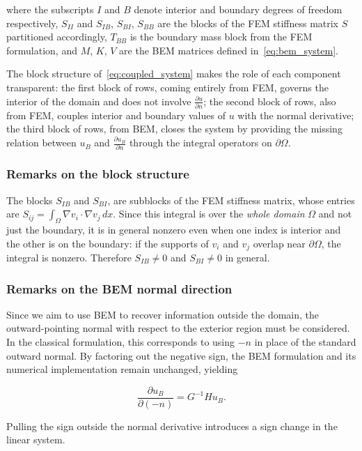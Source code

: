 \documentclass[11pt,onecolumn]{article}
\begin{document}
where the subscripts $I$ and $B$ denote interior and boundary degrees of freedom respectively, $S_{II}$ and $S_{IB}$, $S_{BI}$, $S_{BB}$ are the blocks of the FEM stiffness matrix $S$ partitioned accordingly, $T_{BB}$ is the boundary mass block from the FEM formulation, and $M$, $K$, $V$ are the BEM matrices defined in~\eqref{eq:bem_system}. 

The block structure of~\eqref{eq:coupled_system} makes the role of each component transparent: the first block of rows, coming entirely from FEM, governs the interior of the domain and does not involve $\frac{\partial u}{\partial n}$; the second block of rows, also from FEM, couples interior and boundary values of $u$ with the normal derivative; the third block of rows, from BEM, closes the system by providing the missing relation between $u_B$ and $\frac{\partial u_B}{\partial n}$ through the integral operators on $\partial\Omega$.


\subsubsection{Remarks on the block structure}
The blocks $S_{IB}$ and $S_{BI}$, are subblocks of the FEM stiffness matrix, whose entries are $S_{ij} = \int_{\Omega} \nabla v_i \cdot \nabla v_j \, dx$. Since this integral is over the \textit{whole domain} $\Omega$ and not just the boundary, it is in general nonzero even when one index is interior and the other is on the boundary: if the supports of $v_i$ and $v_j$ overlap near $\partial\Omega$, the integral is nonzero. Therefore $S_{IB} \neq 0$ and $S_{BI} \neq 0$ in general.

\subsubsection{Remarks on the BEM normal direction}

Since we aim to use BEM to recover information outside the domain, the outward-pointing normal with respect to the exterior region must be considered. In the classical formulation, this corresponds to using $-n$ in place of the standard outward normal. By factoring out the negative sign, the BEM formulation and its numerical implementation remain unchanged, yielding

\begin{equation}
    \frac{\partial u_B}{\partial{(-n)}} = G^{-1}H u_B.
    \label{eq:elimination}
\end{equation}

Pulling the sign outside the normal derivative introduces a sign change in the linear system.
\end{document}
